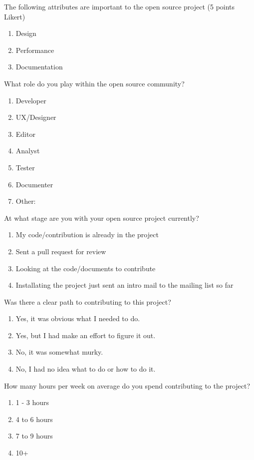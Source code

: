The following attributes are important to the open source project (5 points Likert)
\begin{enumerate}
\item Design
\item Performance
\item Documentation
\end{enumerate}

What role do you play within the open source community?
\begin{enumerate}
\item Developer
\item UX/Designer
\item Editor
\item Analyst
\item Tester
\item Documenter
\item Other:
\end{enumerate}

At what stage are you with your open source project currently?
\begin{enumerate}
\item My code/contribution is already in the project
\item Sent a pull request for review
\item Looking at the code/documents to contribute
\item Installating the project just sent an intro mail to the mailing list so far
\end{enumerate}

Was there a clear path to contributing to this project?
\begin{enumerate}
\item Yes, it was obvious what I needed to do.
\item Yes, but I had make an effort to figure it out.
\item No, it was somewhat murky.
\item No, I had no idea what to do or how to do it.
\end{enumerate}

How many hours per week on average do you spend contributing to the project?
\begin{enumerate}
\item 1 - 3 hours
\item 4 to 6 hours
\item 7 to 9 hours
\item 10+
\end{enumerate}

